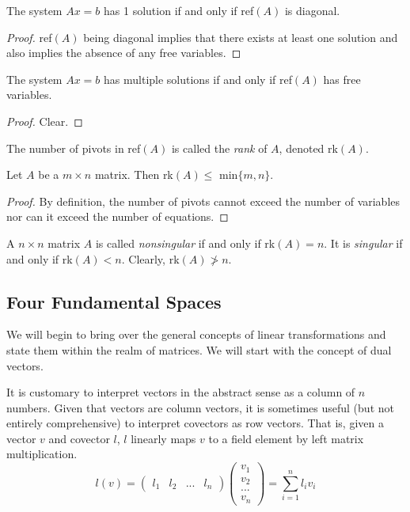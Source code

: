 \documentclass{article}
\begin{document}
    \begin{theorem}
    The system $A x = b$ has 1 solution if and only if ref$(A)$ is diagonal. 
    \end{theorem}

    \begin{proof}
    ref$(A)$ being diagonal implies that there exists at least one solution and also implies the absence of any free variables. 
    \end{proof}

    \begin{theorem}
    The system $A x = b$ has multiple solutions if and only if ref$(A)$ has free variables. 
    \end{theorem}
    \begin{proof}
    Clear. 
    \end{proof}

    \begin{definition}
    The number of pivots in ref$(A)$ is called the \textit{rank} of $A$, denoted rk$(A)$. 
    \end{definition}

    \begin{proposition}
    Let $A$ be a $m \times n$ matrix. Then rk$(A) \leq$ min$\{m ,n\}$. 
    \end{proposition}
    \begin{proof}
    By definition, the number of pivots cannot exceed the number of variables nor can it exceed the number of equations. 
    \end{proof}

    \begin{definition}
    A $n \times n$ matrix $A$ is called \textit{nonsingular} if and only if rk$(A) = n$. It is \textit{singular} if and only if rk$(A) < n$. Clearly, rk$(A) \not> n$. 
    \end{definition}

  \subsection{Four Fundamental Spaces}

    We will begin to bring over the general concepts of linear transformations and state them within the realm of matrices. We will start with the concept of dual vectors. 

    It is customary to interpret vectors in the abstract sense as a column of $n$ numbers. Given that vectors are column vectors, it is sometimes useful (but not entirely comprehensive) to interpret covectors as row vectors. That is, given a vector $v$ and covector $l$, $l$ linearly maps $v$ to a field element by left matrix multiplication. 
    \[ l(v) = \begin{pmatrix} l_1 & l_2 & ... & l_n \end{pmatrix} \begin{pmatrix}
    v_1 \\ v_2 \\ ... \\ v_n
    \end{pmatrix} = \sum_{i = 1}^{n} l_i v_i\]
\end{document}
